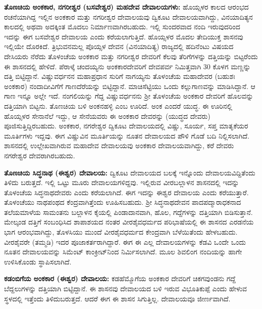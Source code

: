 \textbf{ತೊಣಚಿಯ ಅಂಕಕಾರ, ನಗರೀಶ್ವರ (ಬಸವೇಶ್ವರ) ಮಹದೇವ ದೇವಾಲಯಗಳು:} ಹೊಯ್ಸಳರ ಕಾಲದ ಆರಂಭದ ರಚನೆಯಾಗಿದ್ದ ಇಲ್ಲಿನ ಅಂಕಕಾರ ಮತ್ತು ನಗರೀಶ್ವರ ದೇವಾಲಯವು ದ್ವಿಕೂಟ ದೇವಾಲಯವಾಗಿದ್ದು, ವಿನಯಾದಿತ್ಯನ ಕಾಲದಲ್ಲಿ ಅಥವಾ ಅದಕ್ಕಿಂತ ಮೊದಲು ನಿರ್ಮಾಣವಾಗಿರ\-ಬಹುದು. ಇಲ್ಲಿ ಸುಂದರವಾದ ನಂದಿ ಇರುವುದರಿಂದ ಇದನ್ನು ಈಗ ಬಸವೇಶ್ವರ ದೇವಾಲಯ ಎಂದು ಕರೆಯಲಾಗುತ್ತಿದೆ. ಹೊಯ್ಸಳರ ಮೊದಲ ತೇದಿಯುಕ್ತ ಶಾಸನವು ಇಲ್ಲಿಯೇ ದೊರಕಿದೆ. ತ್ರಿಭುವನಮಲ್ಲ ಪೊಯ್ಸಳ ದೇವನ (ವಿನಯಾದಿತ್ಯ) ರಾಜ್ಯದಲ್ಲಿ ಹದಿನೆಂಟು ವಿಷಯದ ದೇಸಿಯರು ನೆರೆದು ತೊಳಂಚೆಯ ಅಂಕಕಾರ ಮತ್ತು ನಗರೀಶ್ವರ ದೇವರಿಗೆ ಕೆಲವು ತೆರಿಗೆಗಳನ್ನು ದತ್ತಿಯನ್ನು ಬಿಟ್ಟರೆಂದು ಈ ಶಾಸನದಲ್ಲಿ ಹೇಳಿದೆ. ಪೆರಾಳ್ಕೆ ಚಂದಯ್ಯನು ಅಂಕಕಾರದೇವರಿಗೆ ದೇವಪರ್ವ ನಿಮಿತ್ತವಾಗಿ 30 ಕೊಳಗ ಮಣ್ಣನ್ನು ದತ್ತಿ ಬಿಟ್ಟಿದ್ದಾನೆ. ವಿಷ್ಣುವರ್ಧನನ ಮಹಾಪ್ರಧಾನ ಸುರಿಗೆ ನಾಗಯ್ಯನು ತೊಳಂಚೆಯ ಮಹಾದೇವರ (ಬಹುಶಃ ಅಂಕಕಾರ) ನಂದಾದೀವಿಗೆಗೆ ಗಾಣದೆರೆಯನ್ನು ಬಿಟ್ಟಿದ್ದಾನೆ. ಮಾಚಿಸೆಟ್ಟಿಯು ಒಂದು ಕಲ್ಲುಗಾಣವನ್ನು ಮಾಡಿಸಿದ್ದಾನೆ. ಆ ಗಾಣ ಇನ್ನೂ ಅಲ್ಲೇ ಇದೆ. ನಂಗಲಿಯನ್ನು ಗೆದ್ದ ವಿಷ್ಣುವರ್ಧನನು ಶ‍್ರೀ ತೊಳಂಚೆಯ ಅಂಕಕಾರ ದೇವರಿಗೆ ಹೊಲವನ್ನು ದತ್ತಿಯಾಗಿ ಬಿಟ್ಟನು. ತೊಣಚಿಯ ಬಳಿ ಅಂಕನಹಳ್ಳಿ ಎಂಬ ಊರಿದೆ. ಅಂಕ ಎಂದರೆ ಯುದ್ಧ. ಈ ಊರಿನಲ್ಲಿ ಹೊಯ್ಸಳರ ಸೇನಾನೆಲೆ ಇದ್ದು, ಆ ಸೇನೆಯವರು ಈ ಅಂಕಕಾರ ದೇವರನ್ನು (ಯುದ್ಧದ ದೇವರು) ಪೂಜಿಸುತ್ತಿದ್ದಿರಬಹುದು. ಅಂಕಕಾರ, ನಗರೇಶ್ವರ ದ್ವಿಕೂಟ ದೇವಾಲಯದಲ್ಲಿ ವಿಷ್ಣು, ಸೂರ್ಯ, ಸಪ್ತ ಮಾತೃಕೆಯರ ಮೂರ್ತಿಗಳು ಇದ್ದವು. ಈಗ ವಿಷ್ಣುವಿನ ಮೂರ್ತಿಯನ್ನು ನೂತನ ದೇವಾಲಯದ ಪೌಳಿ ಗೊಡೆ ಬದಿ ನಿಲ್ಲಿಸಲಾಗಿದೆ. ಶಾಸನದಲ್ಲಿ ಉಲ್ಲೇಖವಾಗಿರುವ ಮಹಾದೇವ ದೇವಾಲಯವು ಅಂಕಕಾರ ದೇವಾಲಯವಾಗಿದ್ದು, ಕರೆ ದೇವರು ನಗರೇಶ್ವರ ದೇವರಾಗಿರಬಹುದು.

\textbf{ತೊಣಚಿಯ ಸಿದ್ಧನಾಥ (ಈಶ್ವರ) ದೇವಾಲಯ:} ದ್ವಿಕೂಟ ದೇವಾಲಯದ ಬಲಕ್ಕೆ ಇನ್ನೊಂದು ದೇವಾಲಯವಿದ್ದಿತೆಂದು ತಿಳಿದು ಬರುತ್ತದೆ. ಇಲ್ಲಿ ಒಟ್ಟು ಮೂರು ದೇವಾಲಯಗಳಿದ್ದವು. ಇಲ್ಲಿರುವ ವೀರಬಲ್ಲಾಳನ ಶಾಸನದಲ್ಲಿ ಇದನ್ನು ತೊಳಂಚೆಯ ಸಿದ್ಧನಾಥದೇವರು ಎಂದು ಕರೆಯಲಾಗಿದೆ. ಈಗ ಇದನ್ನು ಈಶ್ವರ ದೇವಾಲಯ ಎಂದು ಕರೆಯುತ್ತಾರೆ. ತೊಳಂಚೆಯು ನಾಥಪಂಥದ ಕೆಂದ್ರವಾಗಿತ್ತೆಂದು ಊಹಿಸಬಹುದು. ಶ‍್ರೀ ಸಿದ್ಧನಾಥದೇವನ ಪಾದಪದ್ಮಾರಾಧಕ\-ನಾದ ತಲೆಯಮಾಳೆಯ ಸಾಮಂತನು ಬಲ್ಲಾಳನ ಕೈಯಲ್ಲಿ ಪಿಂಡಾದಾನವಾಗಿ, ಹೊಲ, ಗದ್ದೆಗಳನ್ನು ದತ್ತಿಯಾಗಿ ಬಿಡಿಸುತ್ತಾನೆ. ಮೇಲ್ಕಂಡ ದತ್ತಿಗೆ ಸಂಬಂಧಿಸಿದ ಶಾಪಾಶಯದ ನಂತರ ವೀರಶೈವಧರ್ಮದ ಪರಿಭಾಷೆಯಲ್ಲಿ ಈ ಶಾಸನದ ಎರಡನೆಯ ಭಾಗ ಆರಂಭವಾಗಿದ್ದು, ತೊಳಸಿಯು ಮುಂದೆ ವೀರಶೈವಧರ್ಮದ ಕೇಂದ್ರವಾಗಿ ಬೆಳೆಯಿತೆಂದು ಹೇಳಬಹುದು. ವೀರಶೈವರೇ (ತಮ್ಮಡಿ) ಇದರ ಪೂಜಾಕರ್ತರಾಗಿ\-ದ್ದಾರೆ. ಈಗ ಈ ಎಲ್ಲ ದೇವಾಲಯಗಳನ್ನು ಕೆಡವಿ ಒಂದೇ ಒಂದು ನೂತನ ದೇವಾಲಯವನ್ನು ಸಿಮೆಂಟ್ ಕಾಂಕ್ರೀಟ್‌ನಿಂದ ನಿರ್ಮಿಸಲಾಗಿದೆ. ಮೂಲ ಶಿವಲಿಂಗ ನಂದಿಯನ್ನು ಹಾಗೇ ಉಳಿಸಿಕೊಂಡು ಸ್ಥಾಪಿಸಲಾಗಿದೆ.

\textbf{ಕಡಂಬಿಗೆಯ ಅಂಕಕಾರ (ಈಶ್ವರ) ದೇವಾಲಯ:} ಕಡಹೆಮ್ಮೊಗೆಯ ಅಂಕಕಾರ ದೇವರಿಗೆ ಚಿಕಗವುಂಡನು ಗದ್ದೆ ಬೆದ್ದಲುಗಳನ್ನು ದತ್ತಿಯಾಗಿ ಬಿಟ್ಟಿದ್ದಾನೆ. ಈ ಶಾಸನವು ದೇವಾಲಯದ ಬಳಿ ಇರುವ ವಿಭೂತಿಕುಪ್ಪೆ ಎಂದು ಹೇಳುವ ಸ್ಥಳದಲ್ಲಿ ಇತ್ತೆಂದು ತಿಳಿದುಬರುತ್ತದೆ. ಆದರೆ ಈಗ ಈ ಶಾಸನ ಸಿಗುತ್ತಿಲ್ಲ. ದೇವಾಲಯವೂ ಜೀರ್ಣವಾಗಿದೆ.

